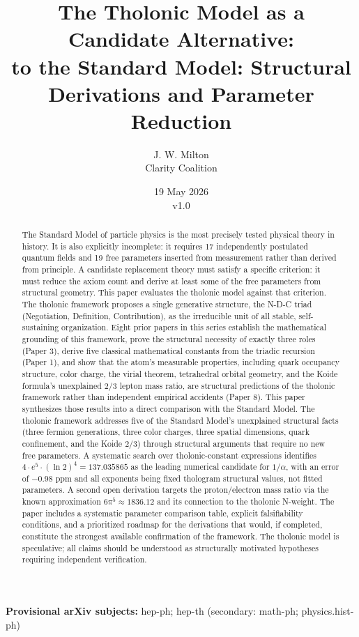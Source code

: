 \documentclass[12pt]{article}
\title{The Tholonic Model as a Candidate Alternative:\\
\large to the Standard Model: Structural Derivations and Parameter Reduction}
\author{J. W. Milton\\[4pt]{\small Clarity Coalition}}
\date{19 May 2026 \\ \small v1.0}
\begin{document}
\maketitle

\noindent\textbf{Provisional arXiv subjects:} hep-ph; hep-th (secondary: math-ph; physics.hist-ph)

\begin{abstract}
The Standard Model of particle physics is the most precisely tested
physical theory in history. It is also explicitly incomplete: it
requires 17 independently postulated quantum fields and 19 free
parameters inserted from measurement rather than derived from principle.
A candidate replacement theory must satisfy a specific criterion: it
must reduce the axiom count and derive at least some of the free
parameters from structural geometry. This paper evaluates the tholonic
model against that criterion. The tholonic framework proposes a single
generative structure, the N-D-C triad (Negotiation, Definition,
Contribution), as the irreducible unit of all stable, self-sustaining
organization. Eight prior papers in this series establish the
mathematical grounding of this framework, prove the structural necessity
of exactly three roles (Paper 3), derive five classical mathematical
constants from the triadic recursion (Paper 1), and show that the atom's
measurable properties, including quark occupancy structure, color
charge, the virial theorem, tetrahedral orbital geometry, and the Koide
formula's unexplained \(2/3\) lepton mass ratio, are structural
predictions of the tholonic framework rather than independent empirical
accidents (Paper 8). This paper synthesizes those results into a direct
comparison with the Standard Model. The tholonic framework addresses
five of the Standard Model's unexplained structural facts (three fermion
generations, three color charges, three spatial dimensions, quark
confinement, and the Koide \(2/3\)) through structural arguments that
require no new free parameters. A systematic search over
tholonic-constant expressions identifies
\(4 \cdot e^5 \cdot (\ln 2)^4 = 137.035865\) as the leading numerical
candidate for \(1/\alpha\), with an error of \(-0.98\) ppm and all
exponents being fixed thologram structural values, not fitted
parameters. A second open derivation targets the proton/electron mass
ratio via the known approximation \(6\pi^5 \approx 1836.12\) and its
connection to the tholonic N-weight. The paper includes a systematic
parameter comparison table, explicit falsifiability conditions, and a
prioritized roadmap for the derivations that would, if completed,
constitute the strongest available confirmation of the framework. The
tholonic model is speculative; all claims should be understood as
structurally motivated hypotheses requiring independent verification.
\end{abstract}
\end{document}
